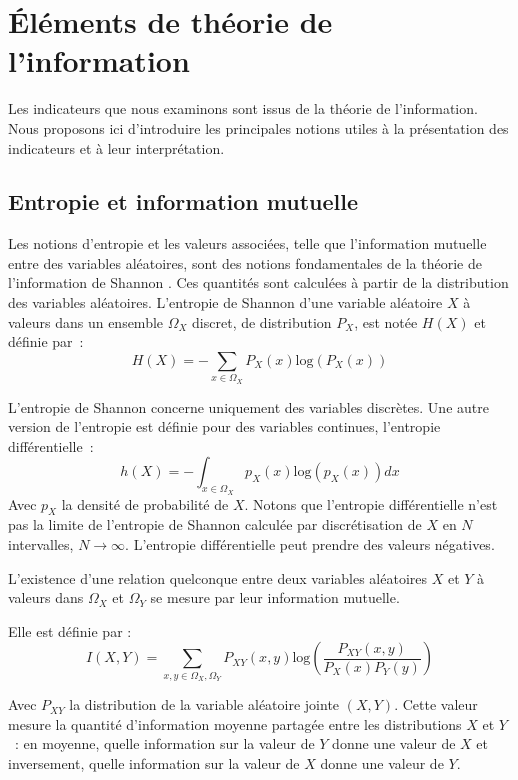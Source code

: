 \documentclass[../main]{subfiles}
\begin{document}
\section{\'Eléments de théorie de l'information}

Les indicateurs que nous examinons sont issus de la théorie de l'information. Nous proposons ici d'introduire les principales notions utiles à la présentation des indicateurs et à leur interprétation.

\subsection{Entropie et information mutuelle}

Les notions d'entropie et les valeurs associées, telle que l'information mutuelle entre des variables aléatoires, sont des notions fondamentales de la théorie de l'information de Shannon \parencite{Shannon1948AMT}. Ces quantités sont calculées à partir de la distribution des variables aléatoires.
L'entropie de Shannon d'une variable aléatoire $X$ à valeurs dans un ensemble $\Omega_X$ discret, de distribution $P_X$, est notée $H(X)$ et définie par~: 
\begin{equation}\label{eq:H}
H(X) = - \sum_{x \in \Omega_X}{P_X(x)\textrm{log}(P_X(x))}
\end{equation}

L'entropie de Shannon concerne uniquement des variables discrètes.
Une autre version de l'entropie est définie pour des variables continues, l'entropie différentielle~:
\begin{equation}
    h(X) = - \int_{x \in \Omega_X}{p_X(x)\textrm{log}(p_X(x))dx}
\end{equation}
Avec $p_X$ la densité de probabilité de $X$.
Notons que l'entropie différentielle n'est pas la limite de l'entropie de Shannon calculée par discrétisation de $X$ en $N$ intervalles, $N \rightarrow \infty$. L'entropie différentielle peut prendre des valeurs négatives.

L'existence d'une relation quelconque entre deux variables aléatoires $X$ et $Y$ à valeurs dans $\Omega_X$ et $\Omega_Y$ se mesure par leur information mutuelle.

Elle est définie par : 
\begin{equation}\label{eq:MI}
 I(X,Y) = \sum_{x,y \in \Omega_X,\Omega_Y}{P_{XY}(x,y)\textrm{log}(\frac{P_{XY}(x,y)}{P_X(x)P_Y(y)})}
\end{equation}

Avec $P_{XY}$ la distribution de la variable aléatoire jointe $(X,Y)$.
Cette valeur mesure la quantité d'information moyenne partagée entre les distributions $X$ et $Y$~: en moyenne, quelle information sur la valeur de $Y$ donne une valeur de $X$ et inversement, quelle information sur la valeur de $X$ donne une valeur de $Y$.
\end{document}
